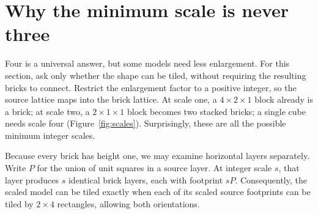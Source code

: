 \documentclass[10pt,reqno]{amsart}
\begin{document}
\section{Why the minimum scale is never three}

Four is a universal answer, but some models need less enlargement.
For this section, ask only whether the shape can be tiled, without
requiring the resulting bricks to connect. Restrict the enlargement
factor to a positive integer, so the source lattice maps into the brick
lattice. At scale one, a $4\times2\times1$ block already is a brick;
at scale two, a $2\times1\times1$ block becomes two stacked bricks;
a single cube needs scale four (Figure~\ref{fig:scales}). Surprisingly,
these are all the possible minimum integer scales.

Because every brick has height one, we may examine horizontal layers
separately. Write $P$ for the union of unit squares in a source layer.
At integer scale $s$, that layer produces $s$ identical brick layers,
each with footprint $sP$. Consequently, the scaled model can be tiled
exactly when each of its scaled source footprints can be tiled by
$2\times4$ rectangles, allowing both orientations.
\end{document}
